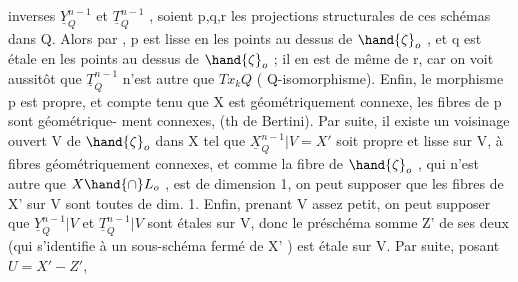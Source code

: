 
inverses $\underline{Y}^{n-1}_Q$ et $\underline{T}^{n-1}_Q$ ,  soient p,q,r les projections structurales
de ces schémas dans Q. Alors par , p est lisse en les
points au dessus de $\hand{\zeta}_o$ , et q est étale en les points au dessus de $\hand{\zeta}_o$ ;
il en est de même de r, car on voit aussitôt que $\underline{T}^{n-1}_Q$ n'est autre que
$Tx_kQ$ ( Q-isomorphisme). Enfin, le morphisme p est propre, et compte
tenu que X est géométriquement connexe, les fibres de p sont géométrique-%
ment connexes, (th de Bertini). Par suite, il existe un voisinage ouvert
V de $\hand{\zeta}_o$ dans X tel que  $\underline{X}^{n-1}_Q|V = X'$ soit propre et lisse
sur V, à fibres géométriquement connexes, et comme la fibre de $\hand{\zeta}_o$ ,
qui n'est autre que $X\hand{\cap} L_o$ , est de dimension 1, on peut supposer que les
fibres de X' sur V sont toutes de dim. 1. Enfin, prenant V assez petit,
on peut supposer que $\underline{Y}^{n-1}_Q|V$ et $\underline{T}^{n-1}_Q|V$ sont étales sur V, donc le
préschéma somme Z' de ses deux (qui s'identifie à un sous-schéma
fermé de X' ) est étale sur V. Par suite,  posant $U = X' - Z'$,
